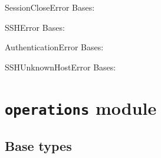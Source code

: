 \documentclass[a4paper,10pt,english]{manual}
\begin{document}
\hypertarget{ncclient.transport.SessionCloseError}{}\begin{excdesc}{SessionCloseError}
Bases: 
\end{excdesc}

\hypertarget{ncclient.transport.SSHError}{}\begin{excdesc}{SSHError}
Bases: 
\end{excdesc}

\hypertarget{ncclient.transport.AuthenticationError}{}\begin{excdesc}{AuthenticationError}
Bases: 
\end{excdesc}

\hypertarget{ncclient.transport.SSHUnknownHostError}{}\begin{excdesc}{SSHUnknownHostError}
Bases: 
\end{excdesc}

\resetcurrentobjects
\hypertarget{--doc-userdoc/operations}{}

\section{\texttt{operations} module}
\hypertarget{module-ncclient.operations}{}

\subsection{Base types}
\end{document}
